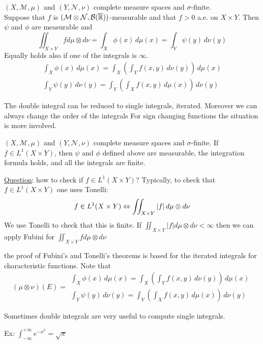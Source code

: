 \begin{theorem}
    \((X, \mathcal{M}, \mu)\) and \((Y, \mathcal{N}, \nu)\) complete measure spaces and \(\sigma\)-finite. \\
    Suppose that \(f\) is \((\mathcal{M} \otimes \mathcal{N}, \mathcal{B}(\overline{\mathbb{R}}))\)-measurable and that \(f > 0\) a.e. on \(X \times Y\). Then \(\psi\) and \(\phi\) are measurable and
    \[
        \iint_{X \times Y} f d\mu \otimes d\nu = \int_X \phi(x) \, d\mu(x) = \int_Y \psi(y) \, d\nu(y) \tag*{Integration formula}
    \]
    Equally holds also if one of the integrals is \(\infty\).
    \[
        \begin{array}{l}
            \int_X \phi(x) \, d\mu(x) = \int_X \left(\int_Y f(x, y) \, d\nu(y) \right) \, d\mu(x) \\
            \int_Y \psi(y) \, d\nu(y) = \int_Y \left(\int_X f(x, y) \, d\mu(x) \right) \, d\nu(y)      
    \end{array}  
    \]
\end{theorem}
\begin{remark}
    The double integral can be reduced to single integrals, iterated. Moreover we can always change the order of the integrals
    For sign changing functions the situation is more involved.
\end{remark}
\begin{theorem}
    \((X, \mathcal{M}, \mu)\) and \((Y, \mathcal{N}, \nu)\) complete measure spaces and \(\sigma\)-finite.
    If \(f \in L^1(X \times Y)\), then \(\psi\) and \(\phi\) defined above are measurable, the integration formula holds, and all the integrals are finite.
\end{theorem}
\noindent\underline{Question}: how to check if \(f\in L^1(X \times Y)\)? Typically, to check that \(f \in L^1(X \times Y)\) one uses Tonelli: 
\[
    f \in L^1(X \times Y) \Leftrightarrow \iint_{X \times Y} \abs{f} \, d\mu \otimes d\nu
\]
We use Tonelli to check that this is finite. 
If \(\iint_{X \times Y} \vert f \vert d\mu \otimes d\nu < \infty\) then we can apply Fubini for \(\iint_{X \times Y} f d\mu \otimes d\nu\)
\begin{remark}
    the proof of Fubini's and Tonelli's theorems is based for the iterated integrals for characteristic functions.
    Note that 
    \[(\mu \otimes \nu)(E) = \begin{array}{l}
        \int_X \phi(x) \, d\mu(x) = \int_X \left(\int_Y f(x, y) \, d\nu(y) \right) \, d\mu(x) \\
        \int_Y \psi(y) \, d\nu(y) = \int_Y \left(\int_X f(x, y) \, d\mu(x) \right) \, d\nu(y)
    \end{array}
    \]
\end{remark}
\begin{remark}
    Sometimes double integrals are very useful to compute single integrals.
\end{remark}
Ex: \(\int_{-\infty}^{+\infty}e^{-x^2} = \sqrt{\pi}\)



